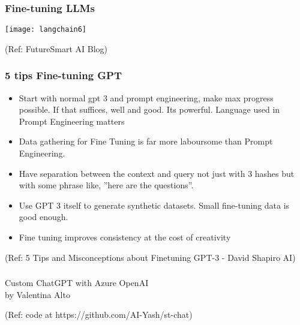 \begin{frame}[fragile]\frametitle{Fine-tuning LLMs}

\begin{center}
\texttt{[image: langchain6]}

{\tiny (Ref: FutureSmart AI Blog)}

\end{center}		


\end{frame}

\begin{frame}[fragile]\frametitle{5 tips Fine-tuning GPT}

\begin{itemize}
\item Start with normal gpt 3 and prompt engineering, make max progress possible. If that suffices, well and good. Its powerful. Language used in Prompt Engineering matters
\item Data gathering for Fine Tuning is far more laboursome than Prompt Engineering.
\item Have separation between the context and query not just with 3 hashes but with some phrase like, ''here are the questions''.
\item Use GPT 3 itself to generate synthetic datasets. Small fine-tuning data is good enough.
\item Fine tuning improves consistency at the cost of creativity
\end{itemize}	

{\tiny (Ref: 5 Tips and Misconceptions about Finetuning GPT-3 - David Shapiro AI)}


\end{frame}



\begin{frame}[fragile]\frametitle{}
\begin{center}
{\Large Custom ChatGPT with Azure OpenAI \\ by Valentina Alto}

{\tiny (Ref: code at https://github.com/AI-Yash/st-chat)}

\end{center}
\end{frame}

